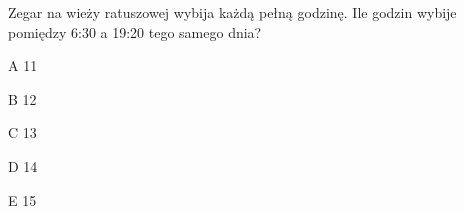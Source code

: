 \begin{tresc}
Zegar na wieży ratuszowej wybija każdą pełną godzinę. Ile godzin wybije pomiędzy 6:30 a 19:20 tego samego dnia?
\end{tresc}
\begin{wariant}{A} 11 \end{wariant}
\begin{wariant}{B} 12 \end{wariant}
\begin{wariant}{C} 13 \end{wariant}
\begin{wariant}{D} 14 \end{wariant}
\begin{wariant}{E} 15 \end{wariant}
